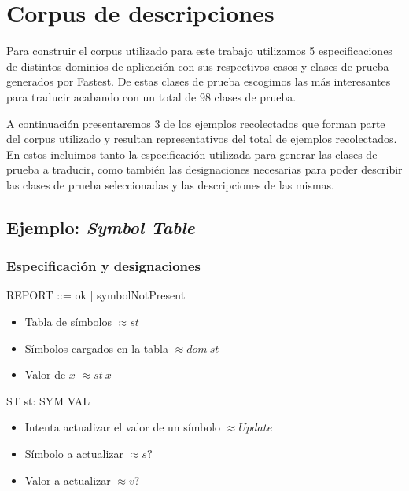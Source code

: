 \chapter{Corpus de descripciones}
\label{ape:corpus}

Para construir el corpus utilizado para este trabajo utilizamos 5 especificaciones de distintos dominios de aplicación con sus respectivos casos y clases de prueba generados por Fastest. De estas clases de prueba escogimos las más interesantes para traducir acabando con un total de 98 clases de prueba.

A continuación presentaremos 3 de los ejemplos recolectados que forman parte del corpus utilizado y resultan representativos del total de ejemplos recolectados. En estos incluimos tanto la especificación utilizada para generar las clases de prueba a traducir, como también las designaciones necesarias para poder describir las clases de prueba seleccionadas y las descripciones de las mismas.

\section*{Ejemplo: \textit{Symbol Table}}

\subsection*{Especificación y designaciones}

\begin{zed}
 \also
REPORT ::= ok | symbolNotPresent
\end{zed}

\begin{itemize}
  \item Tabla de símbolos $\approx st$ \\
  \item Símbolos cargados en la tabla $\approx dom~st$ \\
  \item Valor de $x$ $\approx st~x$ 
\end{itemize}

\begin{schema}{ST}
st: SYM \pfun VAL
\end{schema}

\begin{itemize}
  \item Intenta actualizar el valor de un símbolo $\approx Update$ \\
  \item Símbolo a actualizar $\approx s?$ \\
  \item Valor a actualizar  $\approx v?$ 
\end{itemize}

